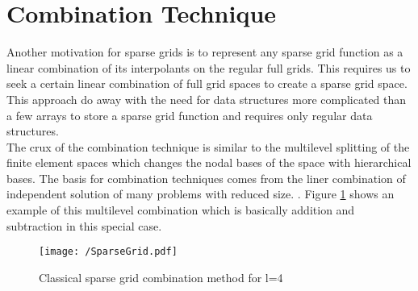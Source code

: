 \section{Combination Technique}
Another motivation for sparse grids is to represent any sparse grid function as a linear combination of its interpolants on the regular full grids. This requires us to seek a certain linear combination of full grid spaces to create a sparse grid space. This approach do away with the need for data structures more complicated than a few arrays to store a sparse grid function and requires only regular data structures.\cite{Griebel1992b} \\
The crux of the combination technique is similar to the multilevel splitting of the finite element spaces which changes the nodal bases of the space with hierarchical bases. \cite{Yserentant1986} The basis for combination techniques comes from the liner combination of independent solution of many problems with reduced size. \cite{Griebel1992}. Figure \ref{fig:Sparsegrid} shows an example of this multilevel combination which is basically addition and subtraction in this special case.\\

		\begin{figure}
			\centering
			\texttt{[image: /SparseGrid.pdf]}
			\caption{Classical sparse grid combination method for l=4}
			\label{fig:Sparsegrid}
		\end{figure}
		
